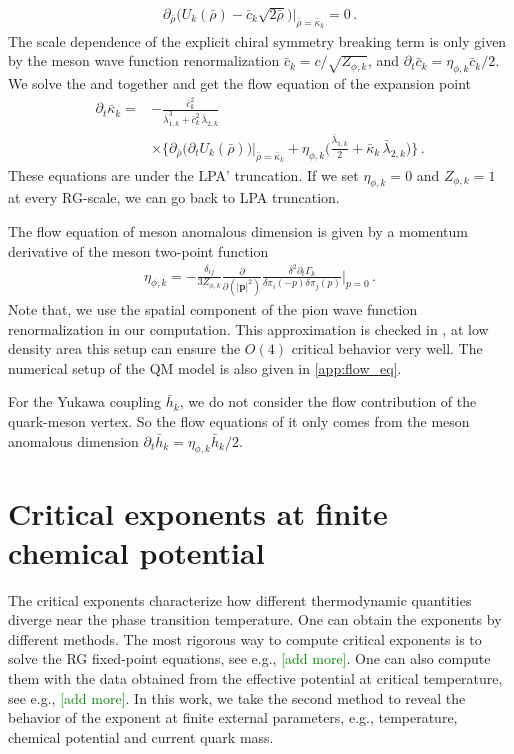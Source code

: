 \documentclass[aps,twocolumn,prd,superscriptaddress,nofootinbib,floatfix]{revtex4-2}
\def\Eq#1{\Cref{#1}}
\newcommand{\colsy}[1]{\textcolor{green}{#1}}
\begin{document}
%
\begin{align}\label{eq:gapeq}
\partial_{\bar\rho}\Big(U_k(\bar\rho)-\bar c_k\sqrt{2\bar\rho}\Big)\bigg|_{\bar\rho=\bar\kappa_k}=0\,.
\end{align}
%
The scale dependence of the explicit chiral symmetry breaking term is only given by the meson wave function renormalization $\bar c_k=c/\sqrt{Z_{\phi,k}}$, and $\partial_t\bar c_k=\eta_{\phi,k}\bar c_k/2$. We solve the \Eq{eq:flow_coef} and \Eq{eq:gapeq} together and get the flow equation of the expansion point
%
\begin{align}
\partial_t\bar \kappa_k=&-\frac{\bar c_k^2}{\bar\lambda^3_{1,k}+\bar c_k^2\,\bar\lambda_{2,k}}\nonumber\\
&\times\bigg\{\partial_{\bar\rho}\Big(\partial_tU_k(\bar\rho)\Big)\bigg|_{\bar\rho=\bar\kappa_k}+\eta_{\phi,k}\Big(\frac{\bar\lambda_{1,k}}{2}+\bar\kappa_k\,\bar\lambda_{2,k}\Big)\bigg\}\,.
\end{align}
%
These equations are under the LPA' truncation. If we set $\eta_{\phi,k}=0$ and $Z_{\phi,k}=1$ at every RG-scale, we can go back to LPA truncation.

The flow equation of meson anomalous dimension is given by a momentum derivative of the meson two-point function
%
\begin{align}\label{eq:eta_phi}
\eta_{\phi,k}=-\frac{\delta_{ij}}{3Z_{\phi,k}}\frac{\partial}{\partial(|\mathbf{p}|^2)}\frac{\delta^2\partial_t\Gamma_k}{\delta\pi_i(-p)\delta\pi_j(p)}\bigg|_{p=0}\,.
\end{align}
%
Note that, we use the spatial component of the pion wave function renormalization in our computation. This approximation is checked in \cite{Yin:2019ebz}, at low density area this setup can ensure the $O(4)$ critical behavior very well. The numerical setup of the QM model is also given in \cref{app:flow_eq}.

For the Yukawa coupling $\bar h_k$, we do not consider the flow contribution of the quark-meson vertex. So the flow equations of it only comes from the meson anomalous dimension $\partial_t \bar h_k=\eta_{\phi,k}\bar h_k/2$.
\section{Critical exponents at finite chemical potential}
\label{sec:exp}
The critical exponents characterize how different thermodynamic quantities diverge near the phase transition temperature. One can obtain the exponents by different methods. The most rigorous way to compute critical exponents is to solve the RG fixed-point equations, see e.g., \cite{Tetradis:1993ts,Tan:2022ksv}\colsy{[add more]}. One can also compute them with the data obtained from the effective potential at critical temperature, see e.g., \cite{Chen:2021iuo,Braun:2023qak}\colsy{[add more]}. In this work, we take the second method to reveal the behavior of the exponent at finite external parameters, e.g., temperature, chemical potential and current quark mass.
\end{document}
